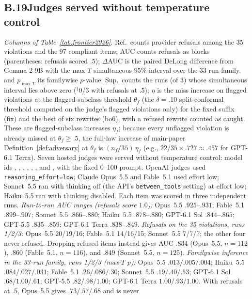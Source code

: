\subsection*{B.19\quad Judges served without temperature control}
\emph{Columns of Table~\ref{tab:frontier2026}.} Ref.\ counts provider refusals among the 35
violations and the 97 compliant items; AUC counts refusals as blocks (parentheses: refusals scored
$.5$); $\Delta$AUC is the paired DeLong difference from Gemma-2-9B with the max-$T$ simultaneous
$95\%$ interval over the 33-run family, and $p_{\max T}$ its familywise $p$-value; Sup.\ counts the
runs (of 3) whose simultaneous interval lies above zero ($^\ddagger$0/3 with refusals at $.5$);
$\eta$ is the miss increase on flagged violations at the flagged-subclass threshold $\theta_f$ (the
$\delta=.10$ split-conformal threshold computed on the judge's flagged violations only) for the fixed suffix
(fix) and the best of six rewrites (bo6), with a refused rewrite counted as caught. These are
flagged-subclass increases $\eta_f$; because every unflagged violation is already missed at
$\theta_f\ge.5$, the full-law increase of main-paper Definition~\ref{def:adversary} at $\theta_f$ is
$(n_f/35)\,\eta_f$ (e.g., $22/35\times.727\approx.457$ for GPT-6.1 Terra).
Seven hosted judges were served without temperature control: model ids ,
, , ,
, , and , with the fixed 0--100
prompt. OpenAI judges used \texttt{reasoning\_effort=low}; Claude Opus~5.5 and Fable~5.1
used effort low; Sonnet~5.5 ran with thinking off (the API's \texttt{between\_tools}
setting) at effort low; Haiku~5.5 ran with thinking disabled. Each item was scored in
three independent runs.
\emph{Run-to-run AUC ranges (refusals score $1.0$):} Opus~5.5 $.925$--$.931$; Fable~5.1
$.899$--$.907$; Sonnet~5.5 $.866$--$.880$; Haiku~5.5 $.878$--$.880$; GPT-6.1 Sol
$.844$--$.865$; GPT-5.5 $.835$--$.859$; GPT-6.1 Terra $.838$--$.849$.
\emph{Refusals on the 35 violations, runs 1/2/3:} Opus~5.5 20/19/16; Fable~5.1
14/16/15; Sonnet~5.5 7/7/7; the other four never refused. Dropping refused items instead
gives AUC $.834$ (Opus~5.5, $n=112$), $.860$ (Fable~5.1, $n=116$), and $.849$
(Sonnet~5.5, $n=125$).
\emph{Familywise inference in the 33-run family, runs 1/2/3 (max-$T$ $p$):} Opus~5.5
$.013/.005/.004$; Haiku~5.5 $.084/.027/.031$; Fable~5.1 $.26/.086/.30$; Sonnet~5.5
$.19/.40/.53$; GPT-6.1 Sol $.68/1.00/.61$; GPT-5.5 $.82/.98/1.00$; GPT-6.1 Terra
$1.00/.93/1.00$. With refusals at $.5$, Opus~5.5 gives $.73/.57/.68$ and is never
